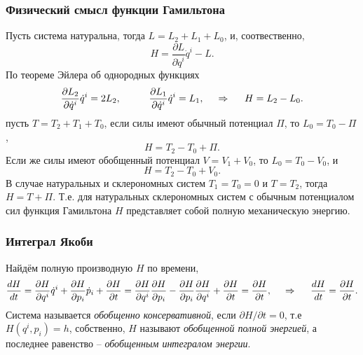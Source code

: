 \subsubsection*{Физический смысл функции Гамильтона}

Пусть система натуральна, тогда $L = L_2 + L_1 + L_0$, и, соотвественно,
\begin{equation*}
    H = \frac{\partial L}{\partial \dot{q}^i} \dot{q}^i - L.
\end{equation*}
По теореме Эйлера об однородных функциях
\begin{equation*}
    \frac{\partial L_2}{\partial \dot{q}^i} \dot{q}^i = 2 L_2,
    \hspace{1cm} 
    \frac{\partial L_1}{\partial \dot{q}^i} \dot{q}^i = L_1,
    \hspace{0.5cm} \Rightarrow \hspace{0.5cm} 
    H = L_2 - L_0.
\end{equation*}
пусть $T = T_2 + T_1 + T_0$, если силы имеют обычный потенциал $\Pi$, то $L_0 = T_0 - \Pi$, 
\begin{equation*}
    H = T_2 - T_0 + \Pi.
\end{equation*}
Если же силы имеют обобщенный потенциал $V = V_1 + V_0$, то $L_0 = T_0 - V_0$, и
\begin{equation*}
    H = T_2 - T_0 + V_0.
\end{equation*}
В случае натуральных и склерономных систем $T_1 = T_0 = 0$ и $T = T_2$, тогда $H = T + \Pi$. Т.е. для натуральных склерономных систем с обычным потенциалом сил функция Гамильтона $H$ представляет собой полную механическую энергию.

\subsubsection*{Интеграл Якоби}

Найдём полную производную $H$ по времени,
\begin{equation*}
    \frac{d H}{d t} = \frac{\partial H}{\partial q^i} \dot{q}^i + \frac{\partial H}{\partial p_i} \dot{p}_i + \frac{\partial H}{\partial t} = 
    \frac{\partial H}{\partial q^i} \frac{\partial H}{\partial p_i} - \frac{\partial H}{\partial p_i} \frac{\partial H}{\partial q^i} + \frac{\partial H}{\partial t} = \frac{\partial H}{\partial t},
    \hspace{0.5cm} \Rightarrow \hspace{0.5cm} 
    \frac{d H}{d t} = \frac{\partial H}{\partial t}.
\end{equation*}
Система называется \textit{обобщенно консервативной}, если $\partial H / \partial t = 0$, т.е $H(q^i, p_i) = h$, собственно, $H$ называют \textit{обобщенной полной энергией}, а последнее равенство -- \textit{обобщенным интегралом энергии}.


